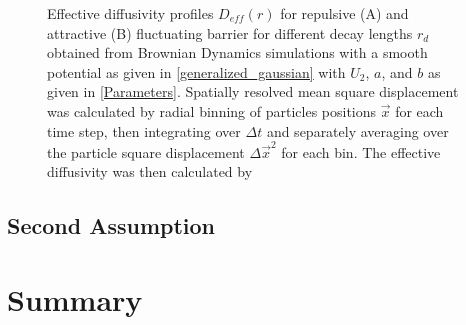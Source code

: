 \begin{minipage}[t]{1 \textwidth}
    \begin{figure}[H]
        \caption{Effective diffusivity profiles $D_{eff}(r)$ for repulsive (A) and attractive (B) fluctuating barrier for different decay lengths $r_d$ obtained from Brownian Dynamics simulations with a smooth potential as given in \eqref{generalized_gaussian} with $U_2$, $a$, and $b$ as given in \eqref{Parameters}. Spatially resolved mean square displacement was calculated by radial binning of particles positions $\vec{x}$ for each time step, then integrating over $\Delta t$ and separately averaging over the particle square displacement $\Delta \vec{x}^{2}$ for each bin. The effective diffusivity was then calculated by \label{Deff_numeric}}   
    \end{figure}
\end{minipage}



\subsection{Second Assumption}

\section{Summary}
